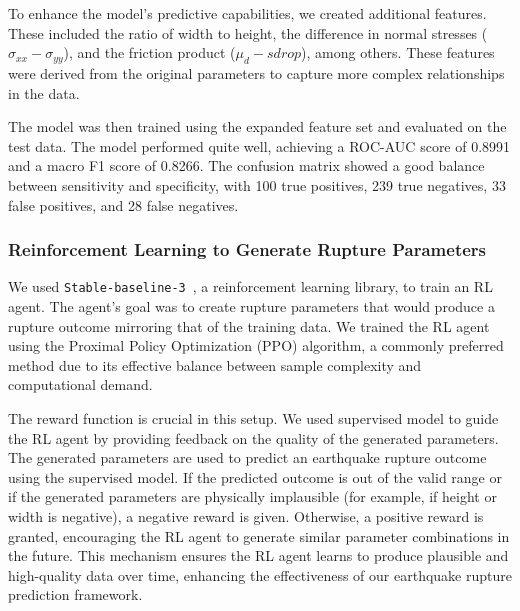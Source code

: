 \documentclass{article}
\begin{document}
To enhance the model's predictive capabilities, we created additional features. These included the ratio of width to height, the difference in normal stresses ($\sigma_{xx} - \sigma_{yy}$), and the friction product ($\mu_{d} - sdrop$), among others. These features were derived from the original parameters to capture more complex relationships in the data.

The model was then trained using the expanded feature set and evaluated on the test data. The model performed quite well, achieving a ROC-AUC score of 0.8991 and a macro F1 score of 0.8266. The confusion matrix showed a good balance between sensitivity and specificity, with 100 true positives, 239 true negatives, 33 false positives, and 28 false negatives.

\subsubsection{Reinforcement Learning to Generate Rupture Parameters}

We used \texttt{Stable-baseline-3}~\cite{stable-baselines3}, a reinforcement learning library, to train an RL agent. The agent's goal was to create rupture parameters that would produce a rupture outcome mirroring that of the training data. We trained the RL agent using the Proximal Policy Optimization (PPO) algorithm\cite{schulman2017proximal}, a commonly preferred method due to its effective balance between sample complexity and computational demand.

The reward function is crucial in this setup. We used supervised model to guide the RL agent by providing feedback on the quality of the generated parameters. The generated parameters are used to predict an earthquake rupture outcome using the supervised model. If the predicted outcome is out of the valid range or if the generated parameters are physically implausible (for example, if height or width is negative), a negative reward is given. Otherwise, a positive reward is granted, encouraging the RL agent to generate similar parameter combinations in the future. This mechanism ensures the RL agent learns to produce plausible and high-quality data over time, enhancing the effectiveness of our earthquake rupture prediction framework.
\end{document}
